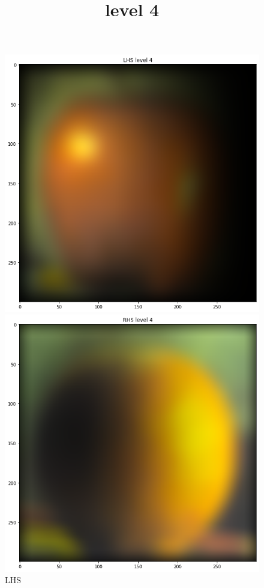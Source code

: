 \documentclass{article}
\begin{document}
\begin{figure}[!htb]
\title{level 4}
    \includegraphics[width=\linewidth]{LHS 4.png}
    \caption{LHS}
\endminipage
{}
    \includegraphics[width=\linewidth]{RHS 4.png}

\end{figure}
\end{document}
